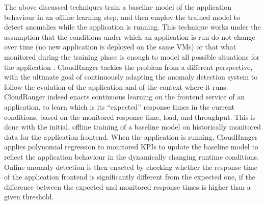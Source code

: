 The above discussed techniques train a baseline model of the application behaviour in an offline learning step, and then employ the trained model to detect anomalies while the application is running. 
This technique works under the assumption that the conditions under which an application is run do not change over time (\eg no new application is deployed on the same VMs) or that what monitored during the training phase is enough to model all possible situations for the application \cite{Xu2017_AdaptiveServiceAPIMonitoring}. 
CloudRanger \cite{29_Wang2018_CloudRanger} tackles the problem from a different perspective, with the ultimate goal of continuously adapting the anomaly detection system to follow the evolution of the application and of the context where it runs. 
CloudRanger \cite{29_Wang2018_CloudRanger} indeed enacts continuous learning on the frontend service of an application, to learn which is its \enquote{expected} response times in the current conditions, \viz based on the monitored response time, load, and throughput.
This is done with the initial, offline training of a baseline model on historically monitored data for the application frontend. %
When the application is running, CloudRanger \cite{29_Wang2018_CloudRanger} applies polynomial regression to monitored KPIs to update the baseline model to reflect the application behaviour in the dynamically changing runtime conditions.
Online anomaly detection is then enacted by checking whether the response time of the application frontend is significantly different from the expected one, \viz if the difference between the expected and monitored response times is higher than a given threshold.

